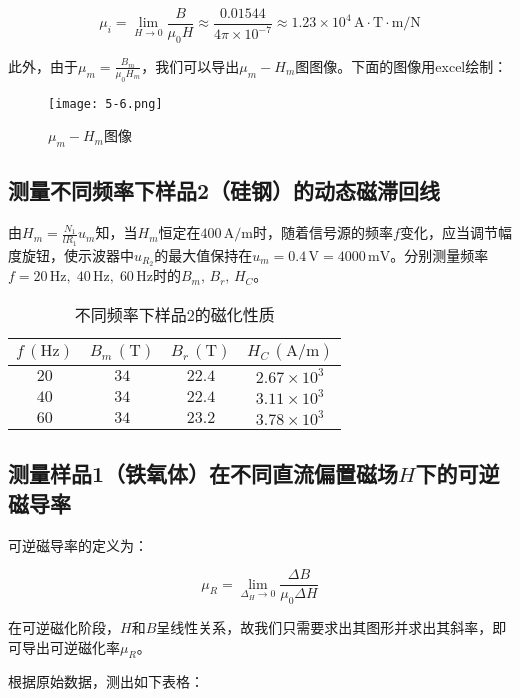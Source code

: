 \documentclass[12pt]{article}
\begin{document}
\[
    \mu_i=\lim_{H\to0}\frac{B}{\mu_0H}\approx\frac{0.01544}{4\pi\times10^{-7}}\approx1.23\times10^{4}\,\mathrm{A}\cdot\mathrm{T}\cdot\mathrm{m}/\mathrm{N}
\]

此外，由于$\mu_m=\frac{B_m}{\mu_0H_m}$，我们可以导出$\mu_m-H_m$图图像。下面的图像用excel绘制：

\begin{figure}[htbp]
    \centering
    \texttt{[image: 5-6.png]}
    \caption{$\mu_m-H_m$图像}
    \label{fig:5}
\end{figure}

\subsection{测量不同频率下样品2（硅钢）的动态磁滞回线}

由$H_m=\frac{N_1}{lR_1}u_{m}$知，当$H_m$恒定在$400\,\mathrm{A/m}$时，随着信号源的频率$f$变化，应当调节幅度旋钮，使示波器中$u_{R_2}$的最大值保持在$u_m=0.4\,\mathrm{V}=4000\,\mathrm{mV}$。分别测量频率$ f=20\,\mathrm{Hz},\;40\,\mathrm{Hz},\;60\,\mathrm{Hz} $时的$ B_m,\,B_r,\,H_C $。

\begin{table}[htbp]
    \centering
    \begin{tabular}{|c|c|c|c|}
        \hline
        $f\,(\mathrm{Hz})$ & $B_m\,(\mathrm{T})$ & $B_r\,(\mathrm{T})$ & $H_C\,(\mathrm{A/m})$ \\
        \hline
        $20$ & $34$ & $22.4$ & $2.67\times10^{3}$ \\
        \hline
        $40$ & $34$ & $22.4$ & $3.11\times10^{3}$ \\
        \hline
        $60$ & $34$ & $23.2$ & $3.78\times10^{3}$ \\
        \hline
    \end{tabular}
    \caption{不同频率下样品2的磁化性质}
\end{table}

\subsection{测量样品1（铁氧体）在不同直流偏置磁场$H$下的可逆磁导率}

可逆磁导率的定义为：

\[
    \mu_R=\lim_{\Delta_H\to0}\frac{\Delta B}{\mu_0\Delta H}
\]

在可逆磁化阶段，$H$和$B$呈线性关系，故我们只需要求出其图形并求出其斜率，即可导出可逆磁化率$\mu_R$。

根据原始数据，测出如下表格：
\end{document}
